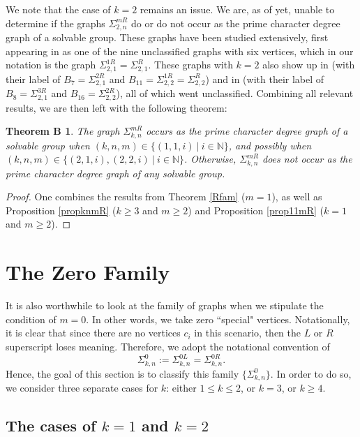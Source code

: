 \documentclass[11pt]{amsart}
\newtheorem*{thmB}{Theorem B}
\theoremstyle{definition}
\theoremstyle{remark}
\numberwithin{equation}{section}
\newcommand{\SR}[2]{\Sigma_{#1,#2}^R} %
\newcommand{\SLi}[3]{\Sigma_{#1,#2}^{#3L}} %
\newcommand{\SRi}[3]{\Sigma_{#1,#2}^{#3R}} %
\newcommand{\SZ}[2]{\Sigma_{#1,#2}^0} %
\begin{document}
We note that the case of $k=2$ remains an issue. We are, as of yet, unable to determine if the graphs $\SRi{2}{n}{m}$ do or do not occur as the prime character degree graph of a solvable group. These graphs have been studied extensively, first appearing in \cite{BLL} as one of the nine unclassified graphs with six vertices, which in our notation is the graph $\SRi{2}{1}{1}=\SR{2}{1}$. These graphs with $k=2$ also show up in \cite{LMS} (with their label of $B_7=\SRi{2}{1}{2}$ and $B_{11}=\SRi{2}{2}{1}=\SR{2}{2}$) and in \cite{LS2} (with their label of $B_8=\SRi{2}{1}{3}$ and $B_{16}=\SRi{2}{2}{2}$), all of which went unclassified. Combining all relevant results, we are then left with the following theorem:

\begin{thmB}
The graph $\SRi{k}{n}{m}$ occurs as the prime character degree graph of a solvable group when $(k,n,m)\in\{(1,1,i)~|~i\in\mathbb{N}\}$, and possibly when $(k,n,m)\in\{(2,1,i), (2,2,i)~|~i\in\mathbb{N}\}$. Otherwise, $\SRi{k}{n}{m}$ does not occur as the prime character degree graph of any solvable group.
\end{thmB}
\begin{proof}
One combines the results from Theorem \ref{Rfam} ($m=1$), as well  as Proposition \ref{propknmR} ($k\geq3$ and $m\geq2$) and Proposition \ref{prop11mR} ($k=1$ and $m\geq2$).
\end{proof}


\section{The Zero Family}\label{seczero}


It is also worthwhile to look at the family of graphs when we stipulate the condition of $m=0$. In other words, we take zero ``special" vertices. Notationally, it is clear that since there are no vertices $c_i$ in this scenario, then the $L$ or $R$ superscript loses meaning. Therefore, we adopt the notational convention of
$$
\SZ{k}{n}:=\SLi{k}{n}{0}=\SRi{k}{n}{0}.
$$
Hence, the goal of this section is to classify this family $\{\SZ{k}{n}\}$. In order to do so, we consider three separate cases for $k$: either $1\leq k\leq2$, or $k=3$, or $k\geq4$.

\subsection{The cases of $k=1$ and $k=2$}
\end{document}
